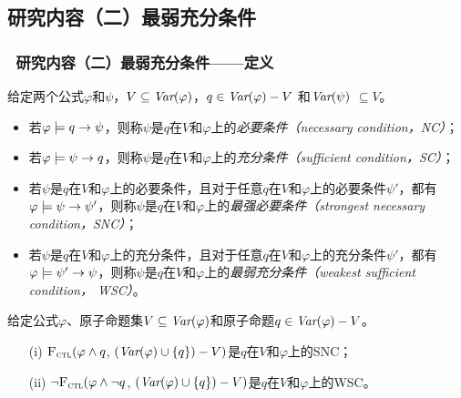\documentclass[9pt, CJK]{beamer}
\begin{document}
\subsection{研究内容（二）最弱充分条件}
\begin{frame}
	\frametitle{~研究内容（二）最弱充分条件——{\footnotesize 定义}}
	{\footnotesize
		\begin{definition}[充分和必要条件]\label{def:NC:SC}
			给定两个公式$\varphi$和$\psi$，$V \subseteq \textit{Var}(\varphi)$，$q\in\textit{Var}(\varphi)- V$
			和$\textit{Var}(\psi)$ $\subseteq V$。
			\begin{itemize}
				\item 若$\varphi \models q \rightarrow \psi$，则称$\psi$是$q$在$V$和$\varphi$上的{\em 必要条件（necessary condition，NC）}；
				\item 若$\varphi \models \psi\rightarrow q$，则称$\psi$是$q$在$V$和$\varphi$上的{\em 充分条件（sufficient condition，SC）}；
				\item 若$\psi$是$q$在$V$和$\varphi$上的必要条件，且对于任意$q$在$V$和$\varphi$上的必要条件$\psi'$，都有$\varphi\models\psi\rightarrow\psi'$，则称$\psi$是$q$在$V$和$\varphi$上的{\em 最强必要条件（strongest necessary condition，SNC）}；
				\item 若$\psi$是$q$在$V$和$\varphi$上的充分条件，且对于任意$q$在$V$和$\varphi$上的充分条件$\psi'$，都有$\varphi\models\psi'\rightarrow\psi$，则称$\psi$是$q$在$V$和$\varphi$上的{\em 最弱充分条件（weakest sufficient condition， WSC）}。
			\end{itemize}
		\end{definition}
		\begin{theorem}\label{thm:SNC:WSC:forget}
			给定公式$\varphi$、原子命题集$V\subseteq\textit{Var}(\varphi)$和原子命题$q\in\textit{Var}(\varphi)- V$。
			\begin{itemize}
				\item[(i)] ${\textsc{F}_{\textsc{ctl}}} (\varphi \land q$, $(\textit{Var}(\varphi) \cup \{q\}) - V)$是$q$在$V$和$\varphi$上的SNC；
				\item[(ii)]  $\neg{\textsc{F}_{\textsc{ctl}}} (\varphi \land \neg q$, $(\textit{Var}(\varphi) \cup \{q\}) - V)$是$q$在$V$和$\varphi$上的WSC。
			\end{itemize}
		\end{theorem}
	}
\end{frame}
\end{document}
